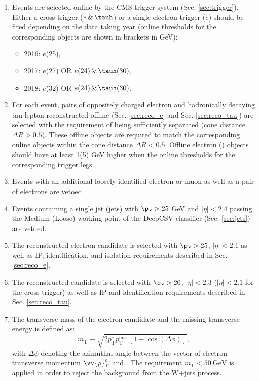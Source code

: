 \begin{enumerate}
    \item Events are selected online by the CMS trigger system (Sec. \ref{sec:trigger}). Either a cross trigger ($e \, \& \, \tauh$) or a single electron trigger ($e$) should be fired depending on the data taking year (online \pt thresholds for the corresponding objects are shown in brackets in GeV):
    \begin{itemize}
        \item 2016: $e$(25),
        \item 2017: $e$(27) OR $e(24) \, \& \, \tauh(30)$,
        \item 2018: $e$(32) OR $e(24) \, \& \, \tauh(30)$.
    \end{itemize}
    
    \item For each event, pairs of oppositely charged electron and hadronically decaying tau lepton reconstructed offline (Sec. \ref{sec:reco_e} and Sec. \ref{sec:reco_tau}) are selected with the requirement of being sufficiently separated (cone distance $\Delta R > 0.5$). These offline objects are required to match the corresponding online objects within the cone distance $\Delta R < 0.5$. Offline electron (\tauh) objects should have \pt at least 1(5) GeV higher when the online \pt thresholds for the corresponding trigger legs. 
    
    \item Events with an additional loosely identified electron or muon as well as a pair of electrons are vetoed.
    
    \item Events containing a single jet (jets) with $\pt > 25$ GeV and $|\eta| < 2.4$ passing the Medium (Loose) working point of the DeepCSV classifier (Sec. \ref{sec:jets}) are vetoed. 
    
    \item The reconstructed electron candidate is selected with $\pt > 25$, $|\eta| < 2.1$ as well as IP, identification, and isolation requirements described in Sec. \ref{sec:reco_e}. 
    
    \item The reconstructed \tauh candidate is selected with $\pt > 20$, $|\eta| < 2.3$ ($|\eta| < 2.1$ for the cross trigger) as well as IP and identification requirements described in Sec. \ref{sec:reco_tau}.
    
    \item The transverse mass of the electron candidate and the missing transverse energy \met is defined as:
    \begin{equation}
        m_\text{T} \equiv \sqrt{2p_\text{T}^e p_\text{T}^\text{miss}[1-\cos(\Delta\phi)]},
    \end{equation}
    with $\Delta\phi$ denoting the azimuthal angle between the vector of electron transverse momentum $\vv{p}_\text{T}^e$ and \met. The requirement $m_\text{T} < 50 ~\text{GeV}$ is applied in order to reject the background from the W+jets process.
    

\end{enumerate}
